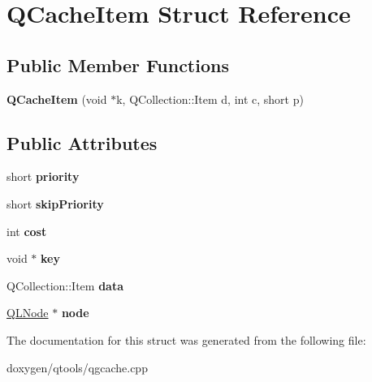 \hypertarget{struct_q_cache_item}{}\section{Q\+Cache\+Item Struct Reference}
\label{struct_q_cache_item}
\subsection*{Public Member Functions}
\begin{DoxyCompactItemize}
\item 
\mbox{\label{struct_q_cache_item_ad61f8abb3dcbd133ecf9cd5b2e4495d1}} 
{\bfseries Q\+Cache\+Item} (void $\ast$k, Q\+Collection\+::\+Item d, int c, short p)
\end{DoxyCompactItemize}
\subsection*{Public Attributes}
\begin{DoxyCompactItemize}
\item 
\mbox{\label{struct_q_cache_item_a2386c848679281880c992f9177e87d93}} 
short {\bfseries priority}
\item 
\mbox{\label{struct_q_cache_item_af5a4fb6189e28d3a7fe695ebf0009a44}} 
short {\bfseries skip\+Priority}
\item 
\mbox{\label{struct_q_cache_item_a0c5dcfef73c448baf7d4b1c887e0c104}} 
int {\bfseries cost}
\item 
\mbox{\label{struct_q_cache_item_a4062cd8ab1f2d787d04d0db83ceed1c8}} 
void $\ast$ {\bfseries key}
\item 
\mbox{\label{struct_q_cache_item_a0f096df61147cc33e14f70e3107b074b}} 
Q\+Collection\+::\+Item {\bfseries data}
\item 
\mbox{\label{struct_q_cache_item_a8dbb49b621edfd42824cde3b07b97943}} 
\mbox{\hyperlink{class_q_l_node}{Q\+L\+Node}} $\ast$ {\bfseries node}
\end{DoxyCompactItemize}


The documentation for this struct was generated from the following file\+:\begin{DoxyCompactItemize}
\item 
doxygen/qtools/qgcache.\+cpp\end{DoxyCompactItemize}
